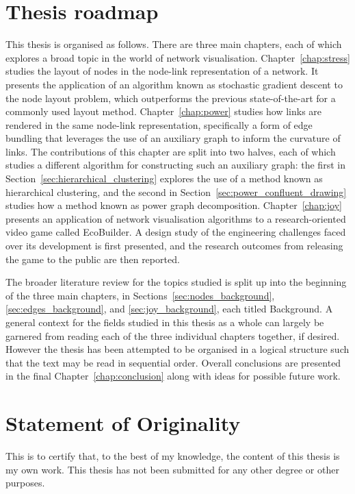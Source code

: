 \section{Thesis roadmap}
This thesis is organised as follows. There are three main chapters, each of which explores a broad topic in the world of network visualisation. Chapter~\ref{chap:stress} studies the layout of nodes in the node-link representation of a network. It presents the  application of an algorithm known as stochastic gradient descent to the node layout problem, which outperforms the previous state-of-the-art for a commonly used layout method.
Chapter~\ref{chap:power} studies how links are rendered in the same node-link representation, specifically a form of edge bundling that leverages the use of an auxiliary graph to inform the curvature of links. The contributions of this chapter are split into two halves, each of which studies a different algorithm for constructing such an auxiliary graph: the first in Section~\ref{sec:hierarchical_clustering} explores the use of a method known as hierarchical clustering, and the second in Section~\ref{sec:power_confluent_drawing} studies how a method known as power graph decomposition.
Chapter~\ref{chap:joy} presents an application of network visualisation algorithms to a research-oriented video game called EcoBuilder. A design study of the engineering challenges faced over its development is first presented, and the research outcomes from releasing the game to the public are then reported.

The broader literature review for the topics studied is split up into the beginning of the three main chapters, in Sections~\ref{sec:nodes_background}, \ref{sec:edges_background}, and \ref{sec:joy_background}, each titled Background. A general context for the fields studied in this thesis as a whole can largely be garnered from reading each of the three individual chapters together, if desired. However the thesis has been attempted to be organised in a logical structure such that the text may be read in sequential order.
Overall conclusions are presented in the final Chapter~\ref{chap:conclusion} along with ideas for possible future work.

\section{Statement of Originality}
This is to certify that, to the best of my knowledge, the content of this thesis is my own work. This thesis has not been submitted for any other degree or other purposes.

